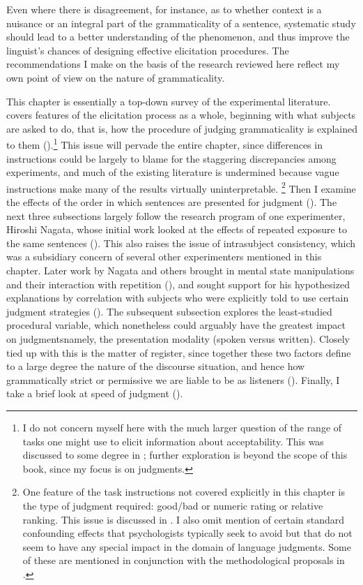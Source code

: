 Even where there is disagreement, for instance, as to whether context is a nuisance or an integral part of the grammaticality of a sentence, systematic study should lead to a better understanding of the phenomenon, and thus improve the linguist's chances of designing effective elicitation procedures. The recommendations I make on the basis of the research reviewed here reflect my own point of view on the nature of grammaticality.

This chapter is essentially a top-down survey of the experimental literature.  covers features of the elicitation process as a whole, beginning with what subjects are asked to do, that is, how the procedure of judging grammaticality is explained to them ().\footnote{I do not concern myself here with the much larger question of the range of tasks one might use to elicit information about acceptability. This was discussed to some degree in ; further exploration is beyond the scope of this book, since my focus is on judgments.} This issue will pervade the entire chapter, since differences in instructions could be largely to blame for the staggering discrepancies among experiments, and much of the existing literature is undermined because vague instructions make many of the results virtually uninterpretable. 
\footnote{One feature of the task instructions not covered explicitly in this chapter is the type of judgment required: good/bad or numeric rating or relative ranking. This issue is discussed in . I also omit mention of certain standard confounding effects that psychologists typically seek to avoid but that do not seem to have any special impact in the domain of language judgments. Some of these are mentioned in conjunction with the methodological proposals in .}
 Then I examine the effects of the order in which sentences are presented for judgment (). The next three subsections largely follow the research program of one experimenter, Hiroshi Nagata, whose initial work looked at the effects of repeated exposure to the same sentences (). This also raises the issue of intrasubject consistency, which was a subsidiary concern of several other experimenters mentioned in this chapter. Later work by Nagata and others brought in mental state manipulations and their interaction with repetition (), and sought support for his hypothesized explanations by correlation with subjects who were explicitly told to use certain judgment strategies (). The subsequent subsection explores the least-studied procedural variable, which nonetheless could arguably have the greatest impact on judgments\schdash{}namely, the presentation modality (spoken versus written). Closely tied up with this is the matter of register, since together these two factors define to a large degree the nature of the discourse situation, and hence how grammatically strict or permissive we are liable to be as listeners (). Finally, I take a brief look at speed of judgment ().


